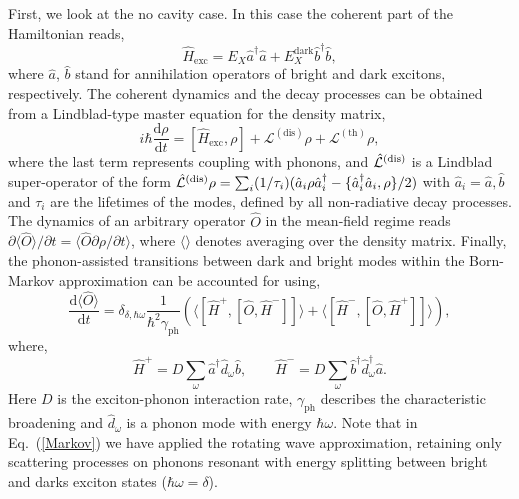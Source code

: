 \documentclass[journal=aamick,manuscript=article]{achemso}
\begin{document}
First, we look at the no cavity case. In this case the coherent part of the Hamiltonian reads,
%
\begin{equation}
\hat{H}_{\mathrm{exc}} = E_X \hat{a}^\dagger \hat{a} +E_X^{\mathrm{dark}} \hat{b}^\dagger \hat{b}, 
\end{equation}
%
where $\hat{a}$, $\hat{b}$ stand for annihilation operators of bright and dark excitons, respectively. The coherent dynamics and the decay processes can be obtained from a Lindblad-type master equation for the density matrix,
%
\begin{equation}
i\hbar\frac{\mathrm{d}\rho}{\mathrm{d}t} =[\hat{H}_{\mathrm{exc}},\rho] + \mathcal{L}^{\mathrm{(dis)}}\rho +\mathcal{L}^{\mathrm{(th)}}\rho,
\end{equation}
%
where the last term represents coupling with phonons, and  $\hat{\mathcal{L}}^{\rm{(dis)}}$ is a Lindblad super-operator of the form $\hat{\mathcal{L}}^{\rm{(dis)}}\rho =\sum_i (1/\tau_i) (\hat{a}_i\rho \hat{a}_i^\dag-\{\hat{a}_i^\dag \hat{a}_i,\rho \}/2)$ with $\hat{a}_i= \hat{a}, \hat{b}$ and $\tau_i$ are the lifetimes of the modes, defined by all non-radiative decay processes. The dynamics of an arbitrary operator $\hat{O}$ in the mean-field regime reads 
$\partial \langle \hat{O}\rangle / \partial t = \langle \hat{O} \partial \rho/\partial t \rangle$, where $\langle \rangle$ denotes averaging over the density matrix. Finally, the phonon-assisted transitions between dark and bright modes within the Born-Markov approximation can be accounted for using,
%
\begin{equation}
\frac{\mathrm{d} \langle \hat{O} \rangle}{\mathrm{d} t} =\delta_{\delta,\hbar\omega} \frac{1}{\hbar^2\gamma_{\mathrm{ph}}} \left(  \langle [\hat{H}^+,[\hat{O},\hat{H}^-]]\rangle +\langle [\hat{H}^-,[\hat{O},\hat{H}^+]]\rangle \right),
\label{Markov}
\end{equation}
%
where,
%
\begin{equation}
\hat{H}^+ = D \sum_{\omega} \hat{a}^\dagger \hat{d}_{\omega} \hat{b}, \qquad \hat{H}^- = D \sum_{\omega} \hat{b}^\dagger \hat{d}^\dagger_{\omega} \hat{a}.
\end{equation}
%
Here $D$ is the exciton-phonon interaction rate, $\gamma_{\mathrm{ph}}$ describes the characteristic broadening and $\hat{d}_{\omega}$ is a phonon mode with energy $\hbar\omega$.
Note that in Eq.~(\ref{Markov}) we have applied the rotating wave approximation, retaining only scattering processes on phonons resonant with energy splitting between bright and darks exciton states ($\hbar\omega=\delta$). 
\end{document}
